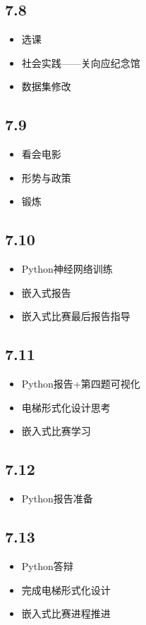 \documentclass[UTF8]{ctexart}
\begin{document}
\subsection*{7.8}
\begin{itemize}
    \item 选课
    \item 社会实践——关向应纪念馆
    \item 数据集修改
\end{itemize}
\subsection*{7.9}
\begin{itemize}
    \item 看会电影
    \item 形势与政策
    \item 锻炼
\end{itemize}
\subsection*{7.10}
\begin{itemize}
    \item Python神经网络训练
    \item 嵌入式报告
    \item 嵌入式比赛最后报告指导
\end{itemize}
\subsection*{7.11}
\begin{itemize}
    \item Python报告+第四题可视化
    \item 电梯形式化设计思考
    \item 嵌入式比赛学习
\end{itemize}
\subsection*{7.12}
\begin{itemize}
    \item Python报告准备
\end{itemize}
\subsection*{7.13}
\begin{itemize}
    \item Python答辩
    \item 完成电梯形式化设计
    \item 嵌入式比赛进程推进
\end{itemize}
\end{document}
